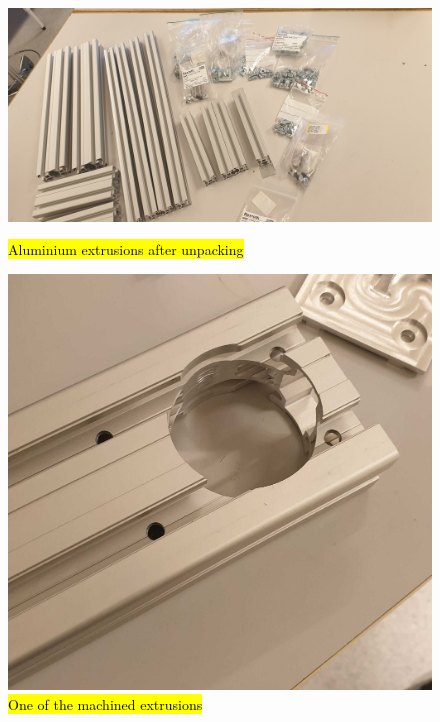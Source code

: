 \begin{figure}[h]
	\centering
	\begin{minipage}[t]{0.4\linewidth}
		\centering
		\includegraphics[width=1\linewidth]{4-experiment-design/img/mechanical/extr.jpg}
		\caption{\hl{Aluminium extrusions after unpacking}}
		\label{fig::mechanical::extrusions}
	\end{minipage}
	\hspace{0.05\linewidth}
	\begin{minipage}[t]{0.4\linewidth}
		\centering
		\includegraphics[width=0.65\linewidth]{4-experiment-design/img/mechanical/ext-mach.jpg}
		\caption{\hl{One of the machined extrusions}}
		\label{fig::mechanical::mach-extr}
	\end{minipage}

\end{figure}
